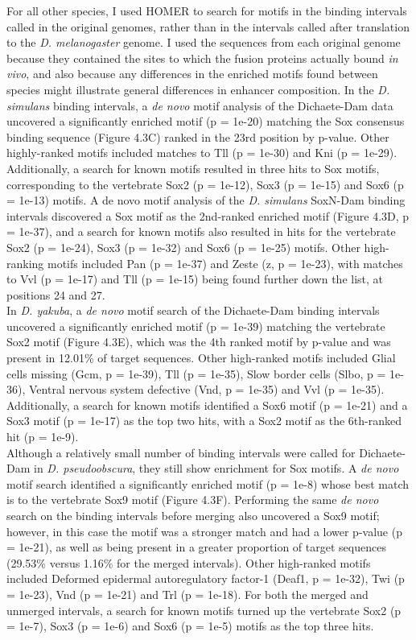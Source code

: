 For all other species, I used HOMER to search for motifs in the binding intervals called in the original genomes, rather than in the intervals called after translation to the \emph{D. melanogaster} genome. I used the sequences from each original genome because they contained the sites to which the fusion proteins actually bound \emph{in vivo}, and also because any differences in the enriched motifs found between species might illustrate general differences in enhancer composition. In the \emph{D. simulans} binding intervals, a \emph{de novo} motif analysis of the Dichaete-Dam data uncovered a significantly enriched motif (p = 1e-20) matching the Sox consensus binding sequence (Figure 4.3C) ranked in the 23rd position by p-value. Other highly-ranked motifs included matches to Tll (p = 1e-30) and Kni (p = 1e-29). Additionally, a search for known motifs resulted in three hits to Sox motifs, corresponding to the vertebrate Sox2 (p = 1e-12), Sox3 (p = 1e-15) and Sox6 (p = 1e-13) motifs. A de novo motif analysis of the \emph{D. simulans} SoxN-Dam binding intervals discovered a Sox motif as the 2nd-ranked enriched motif (Figure 4.3D, p = 1e-37), and a search for known motifs also resulted in hits for the vertebrate Sox2 (p = 1e-24), Sox3 (p = 1e-32) and Sox6 (p = 1e-25) motifs. Other high-ranking motifs included Pan (p = 1e-37) and Zeste (z, p = 1e-23), with matches to Vvl (p = 1e-17) and Tll (p = 1e-15) being found further down the list, at positions 24 and 27.\\

In \emph{D. yakuba}, a \emph{de novo} motif search of the Dichaete-Dam binding intervals uncovered a significantly enriched motif (p = 1e-39) matching the vertebrate Sox2 motif (Figure 4.3E), which was the 4th ranked motif by p-value and was present in 12.01\% of target sequences. Other high-ranked motifs included Glial cells missing (Gcm, p = 1e-39), Tll (p = 1e-35), Slow border cells (Slbo, p = 1e-36), Ventral nervous system defective (Vnd, p = 1e-35) and Vvl (p = 1e-35). Additionally, a search for known motifs identified a Sox6 motif (p = 1e-21) and a Sox3 motif (p = 1e-17) as the top two hits, with a Sox2 motif as the 6th-ranked hit (p = 1e-9).\\

Although a relatively small number of binding intervals were called for Dichaete-Dam in \emph{D. pseudoobscura}, they still show enrichment for Sox motifs. A \emph{de novo} motif search identified a significantly enriched motif (p = 1e-8) whose best match is to the vertebrate Sox9 motif (Figure 4.3F). Performing the same \emph{de novo} search on the binding intervals before merging also uncovered a Sox9 motif; however, in this case the motif was a stronger match and had a lower p-value (p = 1e-21), as well as being present in a greater proportion of target sequences (29.53\% versus 1.16\% for the merged intervals). Other high-ranked motifs included Deformed epidermal autoregulatory factor-1 (Deaf1, p = 1e-32), Twi (p = 1e-23), Vnd (p = 1e-21) and Trl (p = 1e-18). For both the merged and unmerged intervals, a search for known motifs turned up the vertebrate Sox2 (p = 1e-7), Sox3 (p = 1e-6) and Sox6 (p = 1e-5) motifs as the top three hits.\\

